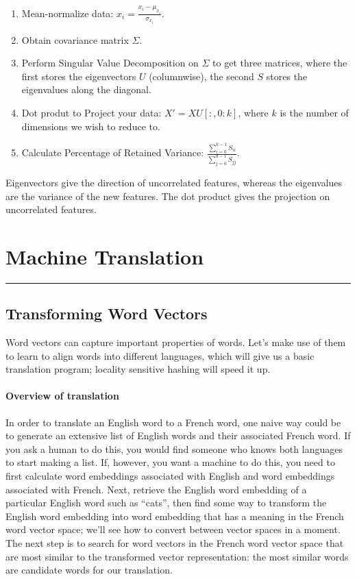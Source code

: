 \documentclass[12pt]{article}
\begin{document}
\begin{enumerate}
\item Mean-normalize data: $x_i = \frac{x_i - \mu_{x_i}}{\sigma_{x_i}}$.
\item Obtain covariance matrix $\Sigma$.
\item Perform Singular Value Decomposition on $\Sigma$ to get three matrices, where the first stores the eigenvectors $U$ (columnwise), the second $S$ stores the eigenvalues along the diagonal.
\item Dot produt to Project your data: $X' = XU[:, 0:k]$, where $k$ is the   number of dimensions we wish to reduce to.
\item Calculate Percentage of Retained Variance: $\frac{\sum_{i=0}^{k-1} S_{ii}}{\sum_{j=0}^{d-1} S_{jj}}$.
\end{enumerate}
Eigenvectors give the direction of uncorrelated features, whereas the eigenvalues are the variance of the new features. The dot product gives the projection on uncorrelated features.

\section{Machine Translation}\vspace{.1pt} \hrule height 2pt \smallskip \renewcommand{\arraystretch}{1}%
\subsection{Transforming Word Vectors}
Word vectors can capture important properties of words. Let's make use of them to learn to align words into different languages, which will give us a basic translation program; locality sensitive hashing will speed it up.

\paragraph{Overview of translation}
In order to translate an English word to a French word, one naive way could be to generate an extensive list of English words and their associated French word. If you ask a human to do this, you would find someone who knows both languages to start making a list. If, however, you want a machine to do this, you need to first calculate word embeddings associated with English and word embeddings associated with French. Next, retrieve the English word embedding of a particular English word such as ``cats'', then find some way to transform the English word embedding into word embedding that has a meaning in the French word vector space; we'll see how to convert between vector spaces in a moment. The next step is to search for word vectors in the French word vector space that are most similar to the transformed vector representation: the most similar words are candidate words for our translation.
\end{document}
